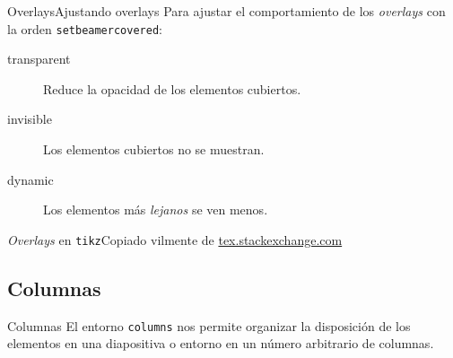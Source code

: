\begin{frame}{Overlays}{Ajustando overlays}
  Para ajustar el comportamiento de los \textit{overlays} con la orden \texttt{setbeamercovered}:
  \espacio

  \begin{block}{}
    \begin{description}
      \item[transparent] Reduce la opacidad de los elementos cubiertos.
      \item[invisible]   Los elementos cubiertos no se muestran.
      \item[dynamic]     Los elementos más \textit{lejanos} se ven menos.
    \end{description}
  \end{block}
\end{frame}

\begin{frame}{\textit{Overlays} en \texttt{tikz}}{Copiado vilmente de %
\href{http://tex.stackexchange.com/questions/55806}{tex.stackexchange.com}}
  \begin{center}
  \end{center}
\end{frame}

\subsection{Columnas}

\begin{frame}{Columnas}
  El entorno \texttt{columns} nos permite organizar la disposición de los
  elementos en una diapositiva o entorno en un número arbitrario de columnas.
  \espacio
  \begin{overlayarea}{\textwidth}{5cm}
  \end{overlayarea}
\end{frame}
